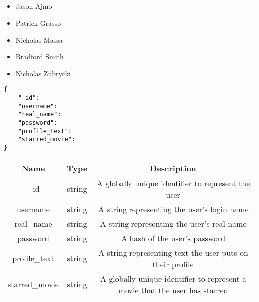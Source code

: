 \documentclass[11pt, letterpaper]{article}
\begin{document}
\\
\\
\noindent{\today}\\
\\

\bigskip


\begin{itemize}
    \item[\textbullet]Jason Ajmo
    \item[\textbullet]Patrick Grasso
    \item[\textbullet]Nicholas Massa
    \item[\textbullet]Bradford Smith
    \item[\textbullet]Nicholas Zubrycki
\end{itemize}



\bigskip

\begin{lstlisting}
{
    "_id":
    "username":
    "real_name":
    "password":
    "profile_text":
    "starred_movie":
}
\end{lstlisting}

\bigskip

\setlength{\tabcolsep}{5pt}
\begin{tabular}{| c | c | c |}
    \toprule
    Name & Type & Description \\
    \midrule
    \_id & string & A globally unique identifier to represent the user\\
    \midrule
    username & string & A string representing the user's login name\\
    \midrule
    real\_name & string & A string representing the user's real name\\
    \midrule
    password & string & A hash of the user's password\\
    \midrule
    profile\_text & string & A string representing text the user puts on their profile\\
    \midrule
    starred\_movie & string & A globally unique identifier to represent a movie that the user has starred\\
    \bottomrule
\end{tabular}
\end{document}
